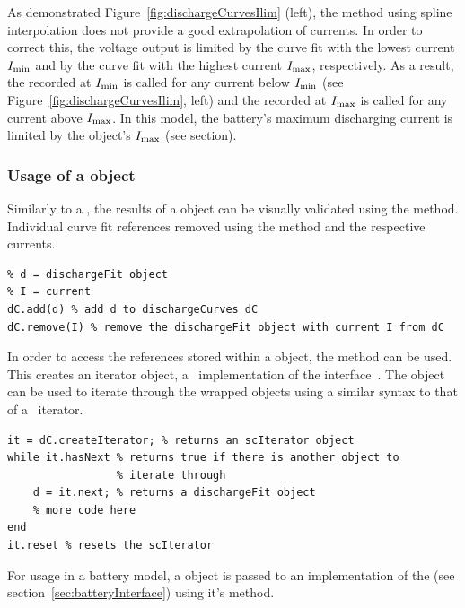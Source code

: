 As demonstrated Figure~\ref{fig:dischargeCurvesIlim} (left), the  method using spline interpolation does not provide a good extrapolation of currents. In order to correct this, the voltage output is limited by the curve fit with the lowest current $I_\text{min}$ and by the curve fit with the highest current $I_\text{max}$, respectively. As a result, the  recorded at $I_\text{min}$ is called for any current below $I_\text{min}$ (see Figure~\ref{fig:dischargeCurvesIlim}, left) and the  recorded at $I_\text{max}$ is called for any current above $I_\text{max}$. In this model, the battery's maximum discharging current is limited by the  object's $I_\text{max}$ (see section).

\subsubsection{Usage of a  object}
Similarly to a , the results of a  object can be visually validated using the  method. Individual curve fit references removed using the  method and the respective currents. \clearpage
\begin{lstlisting}
% d = dischargeFit object
% I = current
dC.add(d) % add d to dischargeCurves dC
dC.remove(I) % remove the dischargeFit object with current I from dC
\end{lstlisting}
In order to access the  references stored within a  object, the  method can be used. This creates an iterator object, a \matlab\ implementation of the  interface~\cite{_iterator_????}. The object can be used to iterate through the wrapped  objects using a similar syntax to that of a \java\ iterator.
\begin{lstlisting}
it = dC.createIterator; % returns an scIterator object
while it.hasNext % returns true if there is another object to
				 % iterate through
	d = it.next; % returns a dischargeFit object
	% more code here
end
it.reset % resets the scIterator
\end{lstlisting}
For usage in a battery model, a  object is passed to an implementation of the  (see section~\ref{sec:batteryInterface}) using it's  method.